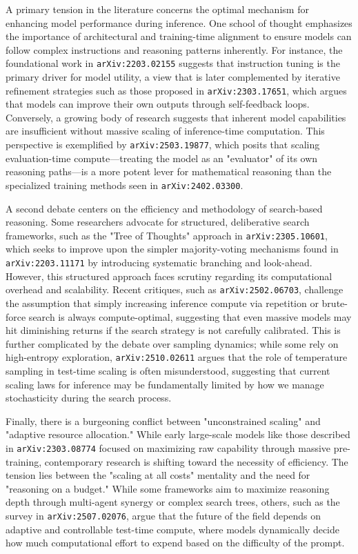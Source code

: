 \documentclass[11pt]{article}
\begin{document}
A primary tension in the literature concerns the optimal mechanism for enhancing model performance during inference. One school of thought emphasizes the importance of architectural and training-time alignment to ensure models can follow complex instructions and reasoning patterns inherently. For instance, the foundational work in \texttt{arXiv:2203.02155} suggests that instruction tuning is the primary driver for model utility, a view that is later complemented by iterative refinement strategies such as those proposed in \texttt{arXiv:2303.17651}, which argues that models can improve their own outputs through self-feedback loops. Conversely, a growing body of research suggests that inherent model capabilities are insufficient without massive scaling of inference-time computation. This perspective is exemplified by \texttt{arXiv:2503.19877}, which posits that scaling evaluation-time compute—treating the model as an "evaluator" of its own reasoning paths—is a more potent lever for mathematical reasoning than the specialized training methods seen in \texttt{arXiv:2402.03300}.

A second debate centers on the efficiency and methodology of search-based reasoning. Some researchers advocate for structured, deliberative search frameworks, such as the "Tree of Thoughts" approach in \texttt{arXiv:2305.10601}, which seeks to improve upon the simpler majority-voting mechanisms found in \texttt{arXiv:2203.11171} by introducing systematic branching and look-ahead. However, this structured approach faces scrutiny regarding its computational overhead and scalability. Recent critiques, such as \texttt{arXiv:2502.06703}, challenge the assumption that simply increasing inference compute via repetition or brute-force search is always compute-optimal, suggesting that even massive models may hit diminishing returns if the search strategy is not carefully calibrated. This is further complicated by the debate over sampling dynamics; while some rely on high-entropy exploration, \texttt{arXiv:2510.02611} argues that the role of temperature sampling in test-time scaling is often misunderstood, suggesting that current scaling laws for inference may be fundamentally limited by how we manage stochasticity during the search process.

Finally, there is a burgeoning conflict between "unconstrained scaling" and "adaptive resource allocation." While early large-scale models like those described in \texttt{arXiv:2303.08774} focused on maximizing raw capability through massive pre-training, contemporary research is shifting toward the necessity of efficiency. The tension lies between the "scaling at all costs" mentality and the need for "reasoning on a budget." While some frameworks aim to maximize reasoning depth through multi-agent synergy or complex search trees, others, such as the survey in \texttt{arXiv:2507.02076}, argue that the future of the field depends on adaptive and controllable test-time compute, where models dynamically decide how much computational effort to expend based on the difficulty of the prompt.
\end{document}
